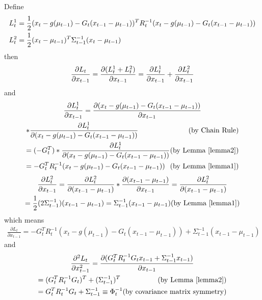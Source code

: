 Define 
\begin{multline*}
L^1_t = \frac{1}{2} (x_t - g(\mu_{t-1}) - G_t (x_{t-1} - \mu_{t-1}))^T R_t^{-1} (x_t - g(\mu_{t-1}) - G_t (x_{t-1} - \mu_{t-1})) \\
L^2_t = \frac{1}{2} (x_t - \mu_{t-1})^T \Sigma_{t-1}^{-1} (x_t - \mu_{t-1}) \hfill
\end{multline*}
then
\begin{multline*}
\frac{\partial L_t}{\partial x_{t-1}} = \frac{\partial (L^1_t + L^2_t)}{\partial x_{t-1}} = \frac{\partial L^1_t}{\partial x_{t-1}} + \frac{\partial L^2_t}{\partial x_{t-1}} \hfill
\end{multline*}
and
\begin{multline*}
\frac{\partial L^1_t}{\partial x_{t-1}} = \frac{\partial (x_t - g(\mu_{t-1}) - G_t (x_{t-1} - \mu_{t-1}))}{\partial x_{t-1}} \\ 
* \frac{\partial L^1_t}{\partial (x_t - g(\mu_{t-1}) - G_t (x_{t-1} - \mu_{t-1}))} \hfill \text{(by Chain Rule)} \\
= (-G_t^T) * \frac{\partial L^1_t}{\partial (x_t - g(\mu_{t-1}) - G_t (x_{t-1} - \mu_{t-1}))} \hfill \text{(by Lemma \ref{lemma2})} \\
= -G_t^TR_t^{-1}(x_t - g(\mu_{t-1}) - G_t (x_{t-1} - \mu_{t-1})) \hfill \text{(by Lemma \ref{lemma1})}
\end{multline*}
\begin{multline*}
\frac{\partial L^2_t}{\partial x_{t-1}} = \frac{\partial L^2_t}{\partial (x_{t-1} - \mu_{t-1})} * \frac{\partial (x_{t-1} - \mu_{t-1})}{\partial x_{t-1}} = \frac{\partial L^2_t}{\partial (x_{t-1} - \mu_{t-1})} \\
= \frac{1}{2} (2\Sigma_{t-1}^{-1}) (x_{t-1} - \mu_{t-1}) =  \Sigma_{t-1}^{-1}(x_{t-1} - \mu_{t-1}) \hfill \text{(by Lemma \ref{lemma1})}
\end{multline*}
which means
\begin{multline*}
\frac{\partial L_t}{\partial x_{t-1}} = -G_t^TR_t^{-1}(x_t - g(\mu_{t-1}) - G_t (x_{t-1} - \mu_{t-1})) + \Sigma_{t-1}^{-1}(x_{t-1} - \mu_{t-1})
\end{multline*}
and
\begin{multline*}
\frac{\partial^2 L_t}{\partial x_{t-1}^2} = \frac{\partial (G_t^TR_t^{-1}G_tx_{t-1} + \Sigma_{t-1}^{-1}x_{t-1})}{\partial x_{t-1}} \\
= (G_t^TR_t^{-1}G_t)^T + (\Sigma_{t-1}^{-1})^T \hfill \text{(by Lemma \ref{lemma2})} \\
= G_t^TR_t^{-1}G_t + \Sigma_{t-1}^{-1} \equiv \Phi_t^{-1} \hfill \text{(by covariance matrix symmetry)}
\end{multline*}

